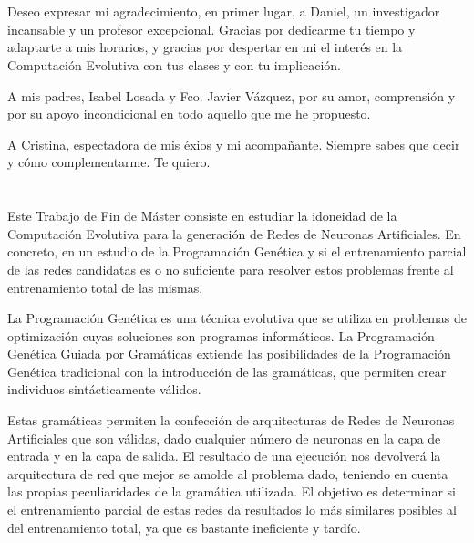 \documentclass[spanish,a4paper,12pt,twoside]{report}
\begin{document}
  \chapter{\vspace{-3cm}{\LARGE Agradecimientos}}
  \vspace{-1cm}
    Deseo expresar mi agradecimiento, en primer lugar, a Daniel, un investigador incansable y un profesor excepcional. Gracias por dedicarme tu tiempo y adaptarte a mis horarios, y gracias por despertar en mi el interés en la Computación Evolutiva con tus clases y con tu implicación.\par
    A mis padres, Isabel Losada y Fco. Javier Vázquez, por su amor, comprensión y por su apoyo incondicional en todo aquello que me he propuesto.\par
    A Cristina, espectadora de mis éxios y mi acompañante. Siempre sabes que decir y cómo complementarme. Te quiero.
  \vfill
  \newpage\cleardoublepage
  
  \chapter{\vspace{-3cm}{\LARGE Resumen}}
  \vspace{-1cm}
  Este Trabajo de Fin de Máster consiste en estudiar la idoneidad de la Computación Evolutiva para la generación de Redes de Neuronas Artificiales. En concreto, en un estudio de la Programación Genética y si el entrenamiento parcial de las redes candidatas es o no suficiente para resolver estos problemas frente al entrenamiento total de las mismas. \par
  La Programación Genética es una técnica evolutiva que se utiliza en problemas de optimización cuyas soluciones son programas informáticos. La Programación Genética Guiada por Gramáticas extiende las posibilidades de la Programación Genética tradicional con la introducción de las gramáticas, que permiten crear individuos sintácticamente válidos. \par
  Estas gramáticas permiten la confección de arquitecturas de Redes de Neuronas Artificiales que son válidas, dado cualquier número de neuronas en la capa de entrada y en la capa de salida. El resultado de una ejecución nos devolverá la arquitectura de red que mejor se amolde al problema dado, teniendo en cuenta las propias peculiaridades de la gramática utilizada. El objetivo es determinar si el entrenamiento parcial de estas redes da resultados lo más similares posibles al del entrenamiento total, ya que es bastante ineficiente y tardío. \vfill
  \newpage\cleardoublepage
  
\end{document}
